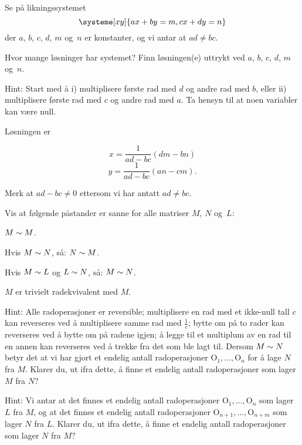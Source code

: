 \begin{oppgave}
Se på likningssystemet
\[
\systeme[xy]{
  ax + by = m,
  cx + dy = n
}
\]
der $a$, $b$, $c$, $d$, $m$ og~$n$ er konstanter, og vi antar at $ad \ne bc$.

Hvor mange løsninger har systemet?  Finn løsningen(e) uttrykt ved $a$,
$b$, $c$, $d$, $m$ og~$n$.

Hint: Start med å i) multiplisere første rad med $d$ og andre rad med $b$, eller ii) multiplisere første rad med $c$ og andre rad med $a$. Ta hensyn til at noen variabler kan være null.
\end{oppgave}
\begin{losning}
Løsningen er

$$x=\frac{1}{ad-bc}(dm-bn)$$
$$y=\frac{1}{ad-bc}(an-cm).$$

Merk at $ad-bc\neq 0$ ettersom vi har antatt $ad\neq bc$.

\end{losning}



\begin{oppgave}
Vis at følgende påstander er sanne for alle matriser $M$, $N$ og~$L$:
\begin{punkt}
$M \sim M$.
\end{punkt}
\begin{punkt}
Hvis $M \sim N$, så: $N \sim M$.
\end{punkt}
\begin{punkt}
Hvis $M \sim L$ og $L \sim N$, så: $M \sim N$.
\end{punkt}
\end{oppgave}

\begin{losning}
\begin{punkt}
	$M$ er trivielt radekvivalent med $M$.
\end{punkt}
\begin{punkt}
	Hint: Alle radoperasjoner er reversible; multiplisere en rad med et ikke-null tall $c$ kan reverseres ved å multiplisere samme rad med $\frac{1}{c}$; bytte om på to rader kan reverseres ved å bytte om på radene igjen; å legge til et multiplum av en rad til en annen kan reverseres ved å trekke fra det som ble lagt til. Dersom $M\sim N$ betyr det at vi har gjort et endelig antall radoperasjoner $\text{O}_1,\dots,\text{O}_n$ for å lage $N$ fra $M$. Klarer du, ut ifra dette, å finne et endelig antall radoperasjoner som lager $M$ fra $N$?
\end{punkt}
\begin{punkt}
	Hint: Vi antar at det finnes et endelig antall radoperasjoner $\text{O}_1,\dots,\text{O}_n$ som lager $L$ fra $M$, og at det finnes et endelig antall radoperasjoner $\text{O}_{n+1},\dots,\text{O}_{n+m}$ som lager $N$ fra $L$. Klarer du, ut ifra dette, å finne et endelig antall radoperasjoner som lager $N$ fra $M$?
\end{punkt}
\end{losning}
